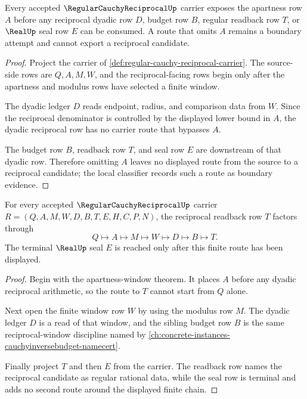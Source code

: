 \begin{theorem}
\label{thm:regular-cauchy-reciprocal-apartness-window}
Every accepted $\RegularCauchyReciprocalUp$ carrier exposes the apartness row $A$ before any reciprocal dyadic row $D$, budget row $B$, regular readback row $T$, or $\RealUp$ seal row $E$ can be consumed. A route that omits $A$ remains a boundary attempt and cannot export a reciprocal candidate.
\end{theorem}
\begin{proof}
Project the carrier of \autoref{def:regular-cauchy-reciprocal-carrier}. The source-side rows are $Q,A,M,W$, and the reciprocal-facing rows begin only after the apartness and modulus rows have selected a finite window.

The dyadic ledger $D$ reads endpoint, radius, and comparison data from $W$. Since the reciprocal denominator is controlled by the displayed lower bound in $A$, the dyadic reciprocal row has no carrier route that bypasses $A$.

The budget row $B$, readback row $T$, and seal row $E$ are downstream of that dyadic row. Therefore omitting $A$ leaves no displayed route from the source to a reciprocal candidate; the local classifier records such a route as boundary evidence.
\end{proof}

\begin{theorem}
\label{thm:regular-cauchy-reciprocal-readback-route}
For every accepted $\RegularCauchyReciprocalUp$ carrier $R=(Q,A,M,W,D,B,T,E,H,C,P,N)$, the reciprocal readback row $T$ factors through
$$
Q\longmapsto A\longmapsto M\longmapsto W\longmapsto D\longmapsto B\longmapsto T.
$$
The terminal $\RealUp$ seal $E$ is reached only after this finite route has been displayed.
\end{theorem}
\begin{proof}
Begin with the apartness-window theorem. It places $A$ before any dyadic reciprocal arithmetic, so the route to $T$ cannot start from $Q$ alone.

Next open the finite window row $W$ by using the modulus row $M$. The dyadic ledger $D$ is a read of that window, and the sibling budget row $B$ is the same reciprocal-window discipline named by \autoref{ch:concrete-instances-cauchyinversebudget-namecert}.

Finally project $T$ and then $E$ from the carrier. The readback row names the reciprocal candidate as regular rational data, while the seal row is terminal and adds no second route around the displayed finite chain.
\end{proof}

